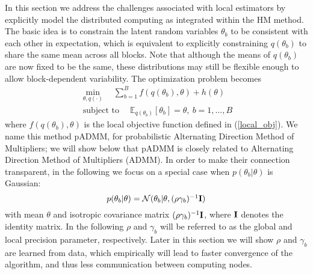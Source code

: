 \documentclass{article}
\DeclareMathOperator*{\st}{subject~to}
\newcommand{\Imat}[0]{\ensuremath{{\bf I}}\xspace}
\newcommand{\1}[0]{\ensuremath{\boldsymbol{1}}\xspace}
\begin{document}
In this section we address the challenges associated with local estimators by explicitly model the distributed computing as integrated within the HM method. The basic idea is to constrain the latent random variables $\theta_b$ to be consistent with each other in expectation, which is equivalent to explicitly constraining $q(\theta_b)$ to share the same mean across all blocks. Note that although the means of $q(\theta_b)$ are now fixed to be the same, these distributions may still be flexible enough to allow block-dependent variability. The optimization problem becomes
\begin{equation}\label{padmm}
\begin{gathered}
\textstyle\min_{\theta, q(\cdot)} \quad\textstyle\sum_{b=1}^B f(q(\theta_b), \theta) + h(\theta)\\
\textstyle\st \quad \mathbb{E}_{q(\theta_b)}[\theta_b] = \theta, ~ b = 1, \ldots, B
\end{gathered}
\end{equation}
where $f(q(\theta_b), \theta)$ is the local objective function defined in (\ref{local_obj}). We name this method pADMM, for probabilistic Alternating Direction Method of Multipliers; we will show below that pADMM is closely related to Alternating Direction Method of Multipliers (ADMM). In order to make their connection transparent, in the following we focus on a special case when $p(\theta_b|\theta)$ is Gaussian:
\begin{equation}\label{gaussian_prior}
\textstyle p(\theta_b|\theta) = \mathcal{N}(\theta_b | \theta, (\rho\gamma_b)^{-1}\Imat)
\end{equation}
with mean $\theta$ and isotropic covariance matrix $(\rho\gamma_b)^{-1}\Imat$, where $\Imat$ denotes the identity matrix. In the following $\rho$ and $\gamma_b$ will be referred to as the global and local precision parameter, respectively. Later in this section we will show $\rho$ and $\gamma_b$ are learned from data, which empirically will lead to faster convergence of the algorithm, and thus less communication between computing nodes.
\end{document}
